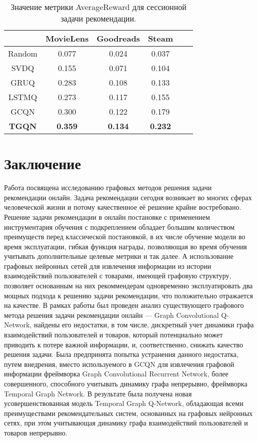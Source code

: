\documentclass[a4paper,14pt,oneside]{mipt-thesis-ms}
\begin{document}
\begin{table}[]
\setlength\tabcolsep{0pt}
\begin{tabular*}{\linewidth}{@{\extracolsep{\fill}} cccccc }
\hline
              & MovieLens      & Goodreads      & Steam          \\ \hline
Random        & 0.077          & 0.024          & 0.037          \\ \hline
SVDQ          & 0.155          & 0.071           & 0.104          \\ \hline
GRUQ          & 0.283          & 0.108          & 0.133          \\ \hline
LSTMQ         & 0.273          & 0.117          & 0.155          \\ \hline
GCQN          & 0.300          & 0.122          & 0.179          \\ \hline
\textbf{TGQN} & \textbf{0.359} & \textbf{0.134} & \textbf{0.232} \\ \hline
\end{tabular*}
\caption{Значение метрики AverageReward для сессионной задачи рекомендации.}
\end{table}


\chapter{Заключение}
Работа посвящена исследованию графовых методов решения задачи рекомендации онлайн. Задача рекомендации сегодня возникает во многих сферах человеческой жизни и потому качественное её решение крайне востребовано. Решение задачи рекомендации в онлайн постановке с применением инструментария обучения с подкреплением обладает большим количеством преимуществ перед классической постановкой, в их числе обучение модели во время эксплуатации, гибкая функция награды, позволяющая во время обучения учитывать дополнительные целевые метрики и так далее. А использование графовых нейронных сетей для извлечения информации из истории взаимодействий пользователей с товарами, имеющей графовую структуру, позволяет основанным на них рекоммендерам одновременно эксплуатировать два мощных подхода к решению задачи рекомендации, что положительно отражается на качестве. 
В рамках работы был проведен анализ существующего графового метода решения задачи рекомендации онлайн --- Graph Convolutional Q-Network, найдены его недостатки, в том числе, дискретный учет динамики графа взаимодействий пользователей и товаров, который потенциально может приводить к потере важной информации, и, соответственно, снижать качество решения задачи. Была предпринята попытка устранения данного недостатка, путем внедрения, вместо используемого в GCQN для извлечения графовой информации фреймворка Graph Convolutional Recurrent Network, более совершенного, способного учитывать динамику графа непрерывно, фреймворка Temporal Graph Network. В результате была получена новая усовершенствованная модель Temporal Graph Q-Network, обладающая всеми преимуществами рекомендательных систем, основанных на графовых нейронных сетях, при этом учитывающая динамику графа взаимодействий пользователей и товаров непрерывно.
\end{document}
